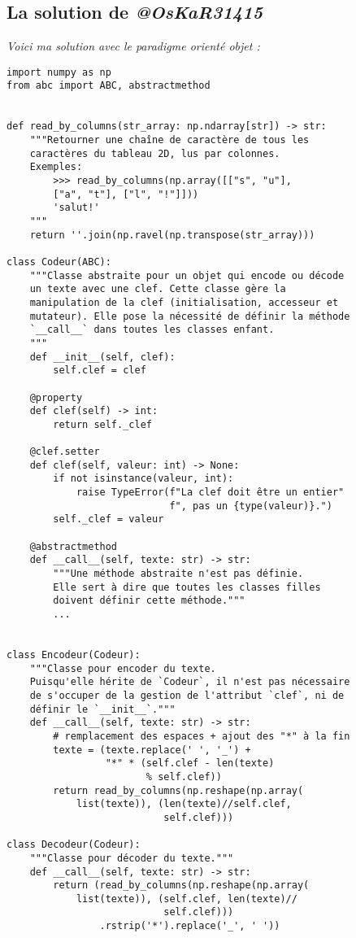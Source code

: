 \subsection*{La solution de \textbf{\textit{@OsKaR31415}}}
\og \textit{Voici ma solution avec le paradigme orienté objet :}
\begin{lstlisting}
import numpy as np
from abc import ABC, abstractmethod


def read_by_columns(str_array: np.ndarray[str]) -> str:
    """Retourner une chaîne de caractère de tous les
    caractères du tableau 2D, lus par colonnes.
    Exemples:
        >>> read_by_columns(np.array([["s", "u"],
        ["a", "t"], ["l", "!"]]))
        'salut!'
    """
    return ''.join(np.ravel(np.transpose(str_array)))

class Codeur(ABC):
    """Classe abstraite pour un objet qui encode ou décode
    un texte avec une clef. Cette classe gère la
    manipulation de la clef (initialisation, accesseur et
    mutateur). Elle pose la nécessité de définir la méthode
    `__call__` dans toutes les classes enfant.
    """
    def __init__(self, clef):
        self.clef = clef

    @property
    def clef(self) -> int:
        return self._clef

    @clef.setter
    def clef(self, valeur: int) -> None:
        if not isinstance(valeur, int):
            raise TypeError(f"La clef doit être un entier"
                            f", pas un {type(valeur)}.")
        self._clef = valeur

    @abstractmethod
    def __call__(self, texte: str) -> str:
        """Une méthode abstraite n'est pas définie.
        Elle sert à dire que toutes les classes filles
        doivent définir cette méthode."""
        ...


class Encodeur(Codeur):
    """Classe pour encoder du texte.
    Puisqu'elle hérite de `Codeur`, il n'est pas nécessaire
    de s'occuper de la gestion de l'attribut `clef`, ni de
    définir le `__init__`."""
    def __call__(self, texte: str) -> str:
        # remplacement des espaces + ajout des "*" à la fin
        texte = (texte.replace(' ', '_') +
                 "*" * (self.clef - len(texte)
                        % self.clef))
        return read_by_columns(np.reshape(np.array(
            list(texte)), (len(texte)//self.clef,
                           self.clef)))

class Decodeur(Codeur):
    """Classe pour décoder du texte."""
    def __call__(self, texte: str) -> str:
        return (read_by_columns(np.reshape(np.array(
            list(texte)), (self.clef, len(texte)//
                           self.clef)))
                .rstrip('*').replace('_', ' '))



\end{lstlisting}
